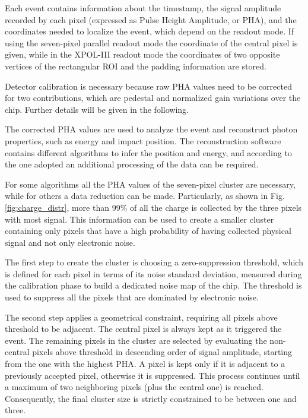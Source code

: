 Each event contains information about the timestamp, the signal amplitude recorded by each pixel (expressed as Pulse Height Amplitude, or PHA), and the coordinates needed to localize the event, which depend on the readout mode. If using the seven-pixel parallel readout mode the coordinate of the central pixel is given, while in the XPOL-III readout mode the coordinates of two opposite vertices of the rectangular ROI and the padding information are stored.

Detector calibration is necessary because raw PHA values need to be corrected for two contributions, which are pedestal and normalized gain variations over the chip. Further details will be given in the following.

The corrected PHA values are used to analyze the event and reconstruct photon properties, such as energy and impact position. The reconstruction software contains different algorithms to infer the position and energy, and according to the one adopted an additional processing of the data can be required.

For some algorithms all the PHA values of the seven-pixel cluster are necessary, while for others a data reduction can be made. Particularly, as shown in Fig. \ref{fig:charge_distr}, more than 99\% of all the charge is collected by the three pixels with most signal. This information can be used to create a smaller cluster containing only pixels that have a high probability of having collected physical signal and not only electronic noise.

The first step to create the cluster is choosing a zero-suppression threshold, which is defined for each pixel in terms of its noise standard deviation, measured during the calibration phase to build a dedicated noise map of the chip. The threshold is used to suppress all the pixels that are dominated by electronic noise.

The second step applies a geometrical constraint, requiring all pixels above threshold to be adjacent. The central pixel is always kept as it triggered the event. The remaining pixels in the cluster are selected by evaluating the non-central pixels above threshold in descending order of signal amplitude, starting from the one with the highest PHA. A pixel is kept only if it is adjacent to a previously accepted pixel, otherwise it is suppressed. This process continues until a maximum of two neighboring pixels (plus the central one) is reached. Consequently, the final cluster size is strictly constrained to be between one and three.

